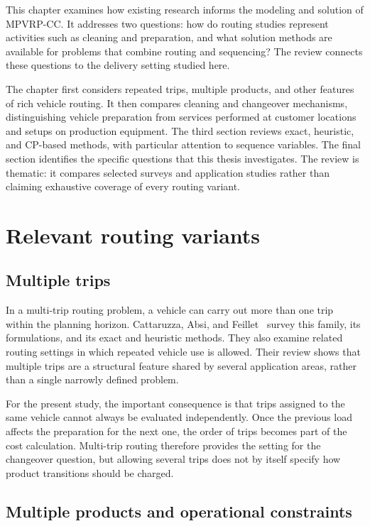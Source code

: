This chapter examines how existing research informs the modeling and
solution of MPVRP-CC. It addresses two questions: how do routing studies
represent activities such as cleaning and preparation, and what solution
methods are available for problems that combine routing and sequencing?
The review connects these questions to the delivery setting studied here.

The chapter first considers repeated trips, multiple products, and other
features of rich vehicle routing. It then compares cleaning and changeover
mechanisms, distinguishing vehicle preparation from services performed at
customer locations and setups on production equipment. The third section
reviews exact, heuristic, and CP-based methods, with particular attention to
sequence variables. The final section identifies the specific questions
that this thesis investigates. The review is thematic: it compares selected
surveys and application studies rather than claiming exhaustive coverage
of every routing variant.

\section{Relevant routing variants}\label{sec:routing-variants}

\subsection{Multiple trips}

In a multi-trip routing problem, a vehicle can carry out more than one trip
within the planning horizon. Cattaruzza, Absi, and
Feillet~\cite{cattaruzza2016multipletrips} survey this family, its formulations,
and its exact and heuristic methods. They also examine related routing
settings in which repeated vehicle use is allowed. Their review shows that
multiple trips are a structural feature shared by several application areas,
rather than a single narrowly defined problem.

For the present study, the important consequence is that trips assigned to
the same vehicle cannot always be evaluated independently. Once the previous
load affects the preparation for the next one, the order of trips becomes
part of the cost calculation. Multi-trip routing therefore provides the
setting for the changeover question, but allowing several trips does not
by itself specify how product transitions should be charged.

\subsection{Multiple products and operational constraints}

